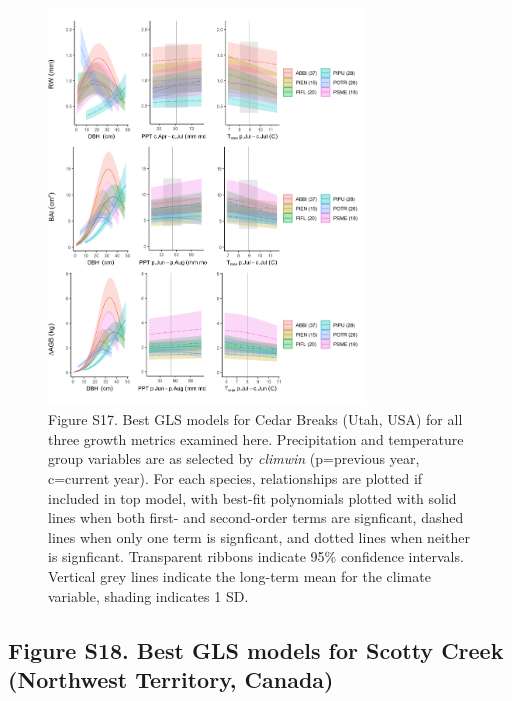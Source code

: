 \documentclass[
]{article}
\begin{document}
\begin{figure}
\centering
\includegraphics[width=0.75\textwidth,height=\textheight]{tables_figures/SI_figures/composite_plots/CedarBreaks.png}
\caption{Figure S17. Best GLS models for Cedar Breaks (Utah, USA) for
all three growth metrics examined here. Precipitation and temperature
group variables are as selected by \emph{climwin} (p=previous year,
c=current year). For each species, relationships are plotted if included
in top model, with best-fit polynomials plotted with solid lines when
both first- and second-order terms are signficant, dashed lines when
only one term is signficant, and dotted lines when neither is
signficant. Transparent ribbons indicate 95\% confidence intervals.
Vertical grey lines indicate the long-term mean for the climate
variable, shading indicates 1 SD.}
\end{figure}

\newpage

\hypertarget{figure-s18.-best-gls-models-for-scotty-creek-northwest-territory-canada}{%
\subsection{Figure S18. Best GLS models for Scotty Creek (Northwest
Territory,
Canada)}\label{figure-s18.-best-gls-models-for-scotty-creek-northwest-territory-canada}}
\end{document}
